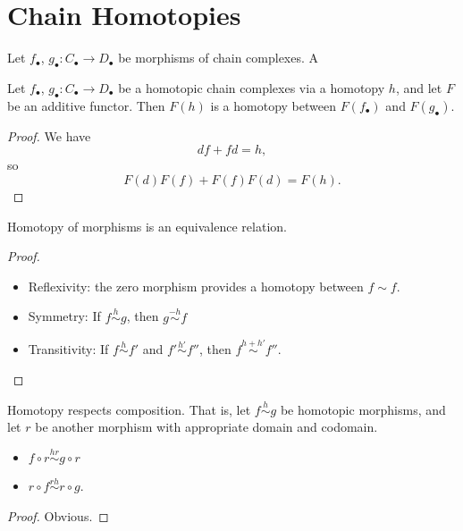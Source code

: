 \documentclass[main.tex]{subfiles}
\begin{document}
\section{Chain Homotopies}
\label{sec:chain_homotopies}

\begin{definition}
  \label{def:chain_homotopy}
  Let $f_{\bullet}$, $g_{\bullet}\colon C_{\bullet} \to D_{\bullet}$ be morphisms of chain complexes. A 
\end{definition}

\begin{lemma}
  \label{lemma:additive_functors_preserve_homotopy}
  Let $f_{\bullet}$, $g_{\bullet}\colon C_{\bullet} \to D_{\bullet}$ be a homotopic chain complexes via a homotopy $h$, and let $F$ be an additive functor. Then $F(h)$ is a homotopy between $F(f_{\bullet})$ and $F(g_{\bullet})$.
\end{lemma}
\begin{proof}
  We have
  \begin{equation*}
    df + fd = h,
  \end{equation*}
  so
  \begin{equation*}
    F(d)F(f) + F(f)F(d) = F(h).
  \end{equation*}
\end{proof}

\begin{lemma}
  \label{lemma:homotopy_equivalence_relation}
  Homotopy of morphisms is an equivalence relation.
\end{lemma}
\begin{proof}
  \leavevmode
  \begin{itemize}
    \item Reflexivity: the zero morphism provides a homotopy between $f \sim f$.

    \item Symmetry: If $f \overset{h}{\sim} g$, then $g \overset{-h}{\sim} f$

    \item Transitivity: If $f \overset{h}{\sim} f'$ and $f' \overset{h'}{\sim} f''$, then $f \overset{h + h'}{\sim} f''$.
  \end{itemize}
\end{proof}

\begin{lemma}
  \label{lemma:homotopy_respects_composition}
  Homotopy respects composition. That is, let $f \overset{h}{\sim} g$ be homotopic morphisms, and let $r$ be another morphism with appropriate domain and codomain.
  \begin{itemize}
    \item $f \circ r \overset{hr}{\sim} g \circ r$

    \item $r \circ f \overset{rh}{\sim} r \circ g$.
  \end{itemize}
\end{lemma}
\begin{proof}
  Obvious.
\end{proof}
\end{document}
